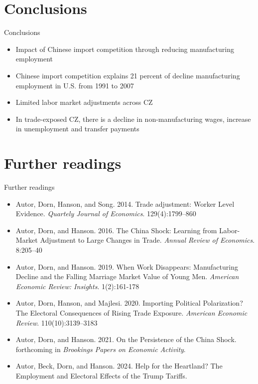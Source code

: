 \documentclass[notes=show]{beamer}
\begin{document}
\section*{Conclusions}

\begin{frame}{Conclusions}
\begin{itemize}
\item Impact of Chinese import competition through reducing manufacturing employment \bigskip
\item Chinese import competition explains 21 percent of decline manufacturing employment in U.S. from 1991 to 2007 \bigskip
\item Limited labor market adjustments across CZ \bigskip
\item In trade-exposed CZ, there is a decline in non-manufacturing wages, increase in unemployment and transfer payments
\end{itemize}
\end{frame}


\section*{Further readings}

\begin{frame}{Further readings}
\begin{itemize}
\footnotesize
\item Autor, Dorn, Hanson, and Song. 2014. Trade adjustment: Worker Level Evidence. \textit{Quartely Journal of Economics}. 129(4):1799–860 \smallskip
\item Autor, Dorn, and Hanson. 2016. The China Shock: Learning from Labor-Market Adjustment to Large Changes in Trade. \textit{Annual Review of Economics}. 8:205–40 \medskip
\item Autor, Dorn, and Hanson. 2019. When Work Disappears: Manufacturing Decline and the Falling Marriage Market Value of Young Men. \textit{American Economic Review: Insights}. 1(2):161-178 \medskip
\item Autor, Dorn, Hanson, and Majlesi. 2020. Importing Political Polarization? The Electoral Consequences of Rising Trade Exposure. \textit{American Economic Review}. 110(10):3139–3183 \medskip
\item Autor, Dorn, and Hanson. 2021. On the Persistence of the China Shock. forthcoming in \textit{Brookings Papers on Economic Activity}. \medskip
\item Autor, Beck, Dorn, and Hanson. 2024. Help for the Heartland? The Employment and Electoral Effects of the Trump Tariffs.
\end{itemize}
\end{frame}
\end{document}
